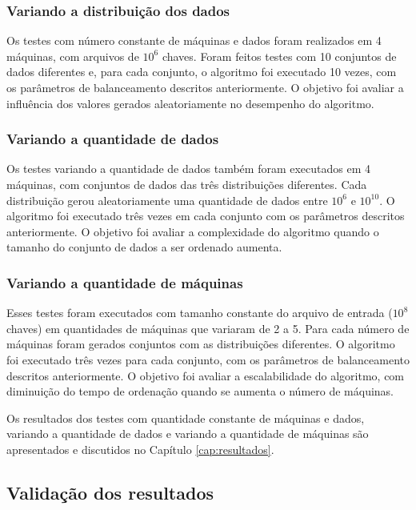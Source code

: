 \subsubsection{Variando a distribuição dos dados} 

Os testes com número constante de máquinas e dados foram realizados em 4 máquinas, com arquivos de $10^{6}$ chaves. Foram feitos testes com 10 conjuntos de dados diferentes e, para cada conjunto, o algoritmo foi executado 10 vezes, com os parâmetros de balanceamento descritos anteriormente.  O objetivo foi avaliar a influência dos valores gerados aleatoriamente no desempenho do algoritmo. 


\subsubsection{Variando a quantidade de dados}
 
 Os testes variando a quantidade de dados também foram executados em 4 máquinas, com conjuntos de dados das três distribuições diferentes. Cada distribuição gerou aleatoriamente uma quantidade de dados entre $10^{6}$ e $10^{10}$. O algoritmo foi executado três vezes em cada conjunto com os parâmetros descritos anteriormente. O objetivo foi avaliar a complexidade do algoritmo quando o tamanho do conjunto de dados a ser ordenado aumenta.
 
\subsubsection{Variando a quantidade de máquinas}

Esses testes foram executados com tamanho constante do arquivo de entrada  ($10^{8}$ chaves) em quantidades de máquinas que variaram de 2 a 5. 
Para cada número de máquinas foram gerados conjuntos com as distribuições diferentes. O algoritmo foi executado três vezes para cada conjunto, com os parâmetros de balanceamento descritos anteriormente. O objetivo foi avaliar a escalabilidade do algoritmo, com diminuição do tempo de ordenação quando se aumenta o número de máquinas.


Os resultados dos testes com quantidade constante de máquinas e dados, variando a quantidade de dados e variando a quantidade de máquinas são apresentados e discutidos no Capítulo \ref{cap:resultados}.

\subsection{Validação dos resultados}


